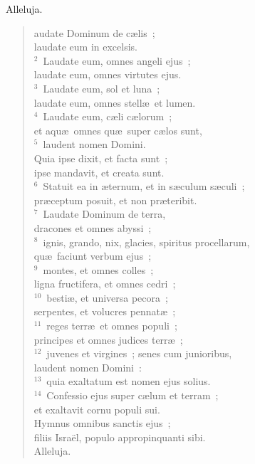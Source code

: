 \bchapter[Psalm]
Alleluja. \begin{verse}audate Dominum de c\ae lis~;\\ laudate eum in excelsis.\\
${}^{2}$~Laudate eum, omnes angeli ejus~;\\ laudate eum, omnes virtutes ejus.\\
${}^{3}$~Laudate eum, sol et luna~;\\ laudate eum, omnes stell\ae\ et lumen.\\
${}^{4}$~Laudate eum, c\ae li c\ae lorum~;\\ et aqu\ae\ omnes qu\ae\ super c\ae los sunt,\\
${}^{5}$~laudent nomen Domini.\\ Quia ipse dixit, et facta sunt~;\\ ipse mandavit, et creata sunt.\\
${}^{6}$~Statuit ea in \ae ternum, et in s\ae culum s\ae culi~;\\ pr\ae ceptum posuit, et non pr\ae teribit.\\
${}^{7}$~Laudate Dominum de terra,\\ dracones et omnes abyssi~;\\
${}^{8}$~ignis, grando, nix, glacies, spiritus procellarum,\\ qu\ae\ faciunt verbum ejus~;\\
${}^{9}$~montes, et omnes colles~;\\ ligna fructifera, et omnes cedri~;\\
${}^{10}$~besti\ae , et universa pecora~;\\ serpentes, et volucres pennat\ae~;\\
${}^{11}$~reges terr\ae\ et omnes populi~;\\ principes et omnes judices terr\ae~;\\
${}^{12}$~juvenes et virgines~; senes cum junioribus,\\ laudent nomen Domini~:\\
${}^{13}$~quia exaltatum est nomen ejus solius.\\
${}^{14}$~Confessio ejus super c\ae lum et terram~;\\ et exaltavit cornu populi sui.\\ Hymnus omnibus sanctis ejus~;\\ filiis Isra\"el, populo appropinquanti sibi.\\ Alleluja.\end{verse}



